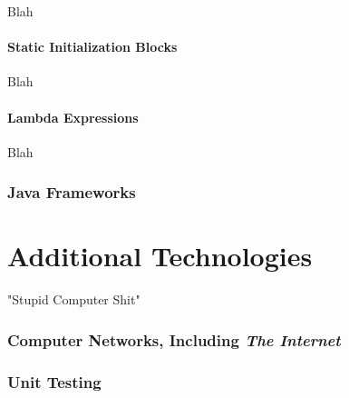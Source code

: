 Blah


\subsection{Static Initialization Blocks}

Blah


\subsection{Lambda Expressions}

Blah \\


\toclineskip
\section{Java Frameworks}

\newpage


\part*{Additional Technologies}

"Stupid Computer Shit"


\toclineskip
\section{Computer Networks, Including \textit{The Internet}}

\section{Unit Testing}

